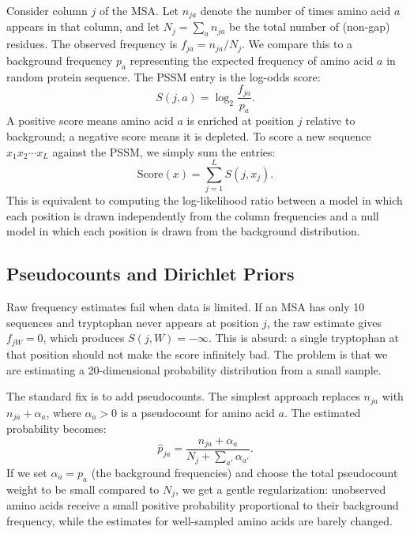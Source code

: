 Consider column $j$ of the MSA.
Let $n_{ja}$ denote the number of times amino acid $a$ appears in that column, and let $N_j = \sum_a n_{ja}$ be the total number of (non-gap) residues.
The observed frequency is $f_{ja} = n_{ja}/N_j$.
We compare this to a background frequency $p_a$ representing the expected frequency of amino acid $a$ in random protein sequence.
The PSSM entry is the log-odds score:
\begin{equation}
\label{eq:pssm-entry}
  S(j, a) = \log_2 \frac{f_{ja}}{p_a}.
\end{equation}
A positive score means amino acid $a$ is enriched at position $j$ relative to background; a negative score means it is depleted.
To score a new sequence $x_1 x_2 \cdots x_L$ against the PSSM, we simply sum the entries:
\begin{equation}
\label{eq:pssm-score}
  \text{Score}(x) = \sum_{j=1}^{L} S(j, x_j).
\end{equation}
This is equivalent to computing the log-likelihood ratio between a model in which each position is drawn independently from the column frequencies and a null model in which each position is drawn from the background distribution.

\subsection{Pseudocounts and Dirichlet Priors}
\label{sec:pseudocounts}

Raw frequency estimates fail when data is limited.
If an MSA has only 10 sequences and tryptophan never appears at position $j$, the raw estimate gives $f_{jW} = 0$, which produces $S(j, W) = -\infty$.
This is absurd: a single tryptophan at that position should not make the score infinitely bad.
The problem is that we are estimating a 20-dimensional probability distribution from a small sample.

The standard fix is to add pseudocounts.
The simplest approach replaces $n_{ja}$ with $n_{ja} + \alpha_a$, where $\alpha_a > 0$ is a pseudocount for amino acid $a$.
The estimated probability becomes:
\begin{equation}
\label{eq:pseudocounts}
  \hat{p}_{ja} = \frac{n_{ja} + \alpha_a}{N_j + \sum_{a'} \alpha_{a'}}.
\end{equation}
If we set $\alpha_a = p_a$ (the background frequencies) and choose the total pseudocount weight to be small compared to $N_j$, we get a gentle regularization: unobserved amino acids receive a small positive probability proportional to their background frequency, while the estimates for well-sampled amino acids are barely changed.

